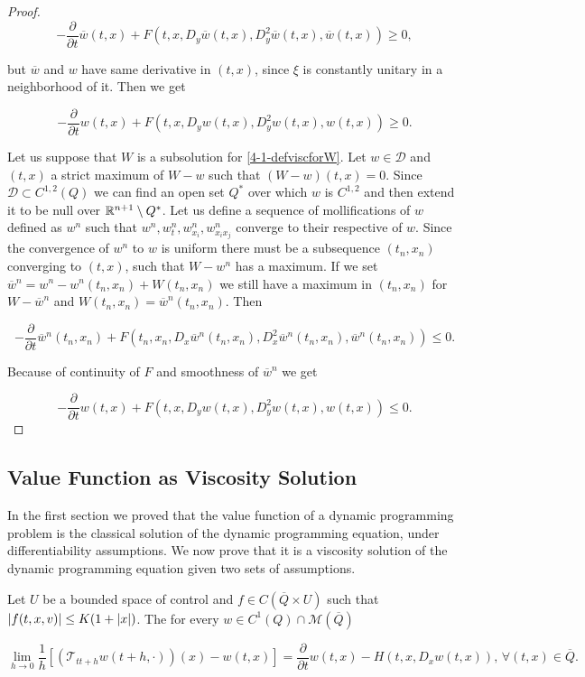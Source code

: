 \begin{theorem}
\begin{proof}
        \[-\frac{\partial}{\partial t}\overline{w}(t,x) + F(t,x,D_y\overline{w}(t,x),D_y^2\overline{w}(t,x),\overline{w}(t,x))\geq0,\]

        but $\overline{w}$ and $w$ have same derivative in $(t,x)$, since $\xi$ is constantly unitary in a neighborhood of it. Then we get

        \[-\frac{\partial}{\partial t}w(t,x) + F(t,x,D_yw(t,x),D_y^2w(t,x),w(t,x))\geq0.\]

        Let us suppose that $W$ is a subsolution for \ref{4-1-defviscforW}. Let $w\in\mathcal{D}$ and $(t,x)$ a strict maximum of $W-w$ such that $(W-w)(t,x)=0$. 
        Since $\mathcal{D}\subset C^{1,2}(Q)$ we can find an open set $Q^{\ast}$ over which $w$ is $C^{1,2}$ and then extend it to be null over $\mathbb{R}^{n+1}\setminus Q^{\ast}$. 
        Let us define a sequence of mollifications of $w$ defined as $w^n$ such that $w^n,w_t^n,w_{x_i}^n,w_{x_ix_j}^n$ converge to their respective of $w$. 
        Since the convergence of $w^n$ to $w$ is uniform there must be a subsequence $(t_n,x_n)$ converging to $(t,x)$, such that $W-w^n$ has a maximum. If we set 
        $\overline{w}^n=w^n-w^n(t_n,x_n)+W(t_n,x_n)$ we still have a maximum in $(t_n,x_n)$ for $W-\overline{w}^n$ and $W(t_n,x_n)=\overline{w}^n(t_n,x_n)$. Then 

        \[-\frac{\partial}{\partial t}\overline{w}^n(t_n,x_n) + F(t_n,x_n,D_x\overline{w}^n(t_n,x_n), D_x^2\overline{w}^n(t_n,x_n), \overline{w}^n(t_n,x_n))\leq0.\]

        Because of continuity of $F$ and smoothness of $\overline{w}^n$ we get
        
        \[-\frac{\partial}{\partial t}w(t,x) + F(t,x,D_yw(t,x),D_y^2w(t,x),w(t,x))\leq0.\]
    \end{proof}
\end{theorem}

\subsection{Value Function as Viscosity Solution}

In the first section we proved that the value function of a dynamic programming problem is the classical solution of the dynamic programming equation, under differentiability 
assumptions. We now prove that it is a viscosity solution of the dynamic programming equation given two sets of assumptions.

\begin{theorem}\label{4-1-viscodynamiceq}
    Let $U$ be a bounded space of control and $f\in C(\overline{Q}\times U)$ such that $\abs{f(t,x,v)}\leq K(1+\abs{x})$. The for every $w\in C^1(Q)\cap \mathcal{M}(\overline{Q})$ 

    \begin{equation}
        \lim_{h\to 0} \frac{1}{h}\left[(\mathcal{T}_{tt+h}w(t+h,\cdot))(x)-w(t,x)\right] = \frac{\partial}{\partial t}w(t,x) - H(t,x,D_xw(t,x)), \,\forall(t,x)\in\overline{Q}.
    \end{equation}
\end{theorem}

